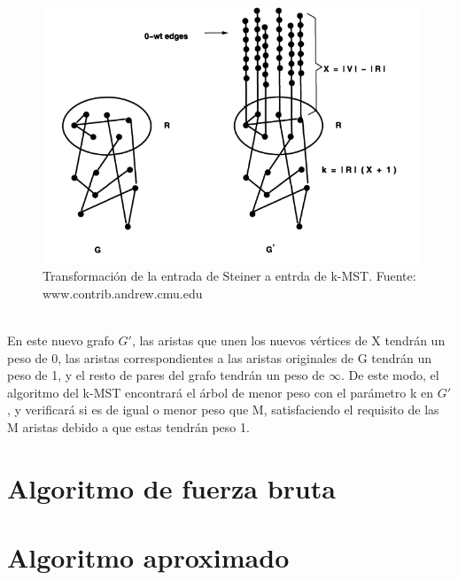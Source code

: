 \documentclass[spanish,12pt]{elsarticle}
\begin{document}
\begin{figure}[h]
    \centering
    \includegraphics[scale=0.65]{images/graph_explicacion.png}
    \caption{Transformación de la entrada de Steiner a entrda de k-MST. Fuente: www.contrib.andrew.cmu.edu }
    \label{fig:my_label}
\end{figure}
\\
En este nuevo grafo $G'$, las aristas que unen los nuevos vértices de X tendrán un peso de 0, las aristas correspondientes a las aristas originales de G tendrán un peso de 1, y el resto de pares del grafo tendrán un peso de $\infty$. De este modo, el algoritmo del k-MST encontrará el árbol de menor peso con el parámetro k en $G'$, y verificará si es de igual o menor peso que M, satisfaciendo el requisito de las M aristas debido a que estas tendrán peso 1.\\



\section{Algoritmo de fuerza bruta}



\section{Algoritmo aproximado}



\end{document}
